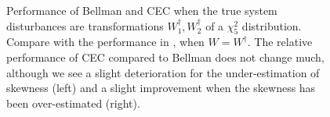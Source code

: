 \documentclass[main.tex]{subfiles}
\begin{document}
\begin{figure}[htbp]
\begin{subfigure}[b]{0.5\textwidth}
  \end{subfigure}
  \caption{Performance of Bellman and CEC when the true system disturbances
  are transformations $W_1^\dagger,W_2^\dagger$ of
  a $\chi_5^2$ distribution. Compare with the performance in
  , when $W=W^\dagger$.
  The relative performance of CEC compared to Bellman does not
  change much,
  although we see a slight deterioration for the under-estimation of
  skewness (left) and a slight improvement when the skewness has
  been over-estimated (right).
}\label{fig:markdown_bellman_mpc_chi2}
\end{figure}


\biblio
\end{document}
